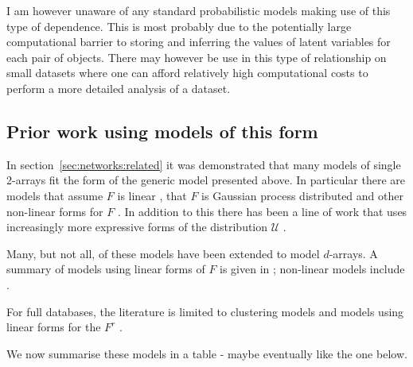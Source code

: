 I am however unaware of any standard probabilistic models making use of this type of dependence.
This is most probably due to the potentially large computational barrier to storing and inferring the values of latent variables for each pair of objects.
There may however be use in this type of relationship on small datasets where one can afford relatively high computational costs to perform a more detailed analysis of a dataset.

\subsection{Prior work using models of this form}

In section~\ref{sec:networks:related} it was demonstrated that many models of single 2-arrays fit the form of the generic model presented above.
In particular there are models that assume $F$ is linear \citep[e.g.][]{Hoff2007a, Meeds2007, Salakhutdinov2008, Yu2008, Miller2009}, that $F$ is Gaussian process distributed \citep[e.g.][]{Lawrence2009, Yan2011, Lloyd2012} and other non-linear forms for $F$ \citep[e.g.][]{Hoff2002, Roy2009}.
In addition to this there has been a line of work that uses increasingly more expressive forms of the distribution $\mathcal{U}$ \citep[e.g.][]{Wang1987, Nowicki2001, Kemp2006, Xu2006, Meeds2007, Miller2009, Palla2012}.

Many, but not all, of these models have been extended to model $d$-arrays.
A summary of models using linear forms of $F$ is given in \cite{Kolda2009}; non-linear models include \cite{Xu2012}.

For full databases, the literature is limited to clustering models \cite{Kemp2006} and models using linear forms for the $F^r$ \citep[e.g.][]{Acar, Acar2012, Acar2013, Andersen2013, Davison, Ermis1958, Gallinari2011, Jimeng2009, Kong2010, Lippert2008, Networks, Nickel2011, Shangguan2012, Singh, Singha, Singh2008}.

We now summarise these models in a table - maybe eventually like the one below.

